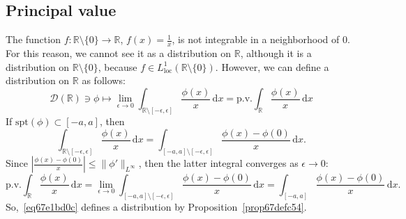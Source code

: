 \documentclass[a4paper,9pt]{amsart}
\newcommand{\scr}[1]{\mathscr{#1}}
\newcommand{\R}{\mathbb{R}}	%
\newcommand{\did}{\,\mathrm{d}}	%
\newcommand{\spt}{\mathrm{spt}}
\newcommand{\loc}{\mathrm{loc}}
\theoremstyle{plain}
\theoremstyle{definition}
\theoremstyle{remark}
\begin{document}
\subsection{Principal value}\label{subs67e1b7b7}
\newcommand{\pv}{\text{p.v.}}
The function $f:\R\setminus\{0\}\to\R$, $f(x)= \frac1x$, is not integrable in a neighborhood of $0$.
For this reason, we cannot see it as a distribution on $\R$, although it is a distribution on $\R\setminus\{0\}$, because $f\in L^1_\loc(\R\setminus\{0\})$.
However, we can define a distribution on $\R$ as follows:
\begin{equation}\label{eq67e1bd0c}
	\scr D(\R) \ni \phi \mapsto \lim_{\epsilon\to0} \int_{\R\setminus[-\epsilon,\epsilon]} \frac{\phi(x)}{x} \did x 
	= \pv \int_\R \frac{\phi(x)}{x} \did x
\end{equation}
If $\spt(\phi)\subset[-a,a]$, then
\begin{equation}
 	\int_{\R\setminus[-\epsilon,\epsilon]} \frac{\phi(x)}{x} \did x
	= \int_{[-a,a]\setminus[-\epsilon,\epsilon]} \frac{\phi(x)-\phi(0)}{x} \did x .
\end{equation}
Since
$\left|\frac{\phi(x)-\phi(0)}{x}\right| \le \|\phi'\|_{L^\infty}$,
then the latter integral converges as $\epsilon\to0$:
\begin{equation}
	\pv \int_\R \frac{\phi(x)}{x} \did x
	= \lim_{\epsilon\to0} \int_{[-a,a]\setminus[-\epsilon,\epsilon]} \frac{\phi(x)-\phi(0)}{x} \did x
	= \int_{[-a,a]} \frac{\phi(x)-\phi(0)}{x} \did x .
\end{equation}
So,~\eqref{eq67e1bd0c} defines a distribution by Proposition~\ref{prop67defc54}.


\end{document}
